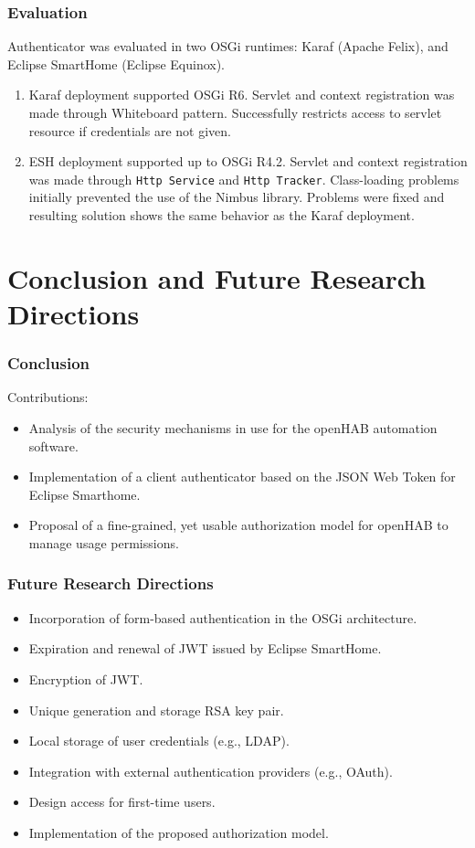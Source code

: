 \documentclass{beamer}
\begin{document}
\begin{frame}
\frametitle{Evaluation}
Authenticator was evaluated in two OSGi runtimes: Karaf (Apache Felix), and Eclipse SmartHome (Eclipse Equinox).
\begin{enumerate}
  \setlength\itemsep{1.5em}
\item Karaf deployment supported OSGi R6. Servlet and context registration was made through Whiteboard pattern. Successfully restricts access to servlet resource if credentials are not given.
\item ESH deployment supported up to OSGi R4.2. Servlet and context registration was made through \texttt{Http Service} and \texttt{Http Tracker}. Class-loading problems initially prevented the use of the Nimbus library. Problems were fixed and resulting solution shows the same behavior as the Karaf deployment. 
\end{enumerate}
\end{frame}
\section{Conclusion and Future Research Directions}
\begin{frame}
\frametitle{Conclusion}
Contributions:
\begin{itemize}
  \setlength\itemsep{1.5em}
\item Analysis of the security mechanisms in use for the openHAB automation software.
\item Implementation of a client authenticator based on the JSON Web Token for Eclipse Smarthome.
\item Proposal of a fine-grained, yet usable authorization model for openHAB to manage usage permissions.
\end{itemize}
\end{frame}
\begin{frame}
\frametitle{Future Research Directions}
\begin{itemize}
  \setlength\itemsep{0.9em}
\item Incorporation of form-based authentication in the OSGi architecture.
\item Expiration and renewal of JWT issued by Eclipse SmartHome.
\item Encryption of JWT.
\item Unique generation and storage RSA key pair.
\item Local storage of user credentials (e.g., LDAP).
\item Integration with external authentication providers (e.g., OAuth).
\item Design access for first-time users.
\item Implementation of the proposed authorization model.
\end{itemize}

\end{frame}
\end{document}

